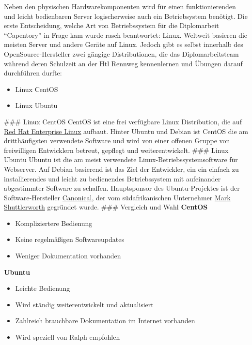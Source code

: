 \documentclass[
]{article}
\providecommand{\tightlist}{%
  \setlength{\itemsep}{0pt}\setlength{\parskip}{0pt}}
\begin{document}
Neben den physischen Hardwarekomponenten wird für einen funktionierenden
und leicht bedienbaren Server logischerweise auch ein Betriebsystem
benötigt. Die erste Entscheidung, welche Art von Betriebssystem für die
Diplomarbeit ``Capentory'' in Frage kam wurde rasch beantwortet: Linux.
Weltweit basieren die meisten Server und andere Geräte auf Linux. Jedoch
gibt es selbst innerhalb des OpenSource-Hersteller zwei gängige
Distributionen, die das Diplomarbeitsteam während deren Schulzeit an der
Htl Rennweg kennenlernen und Übungen darauf durchführen durfte:
\begin{itemize}
\tightlist
\item
  Linux CentOS
\item
  Linux Ubuntu
\end{itemize} 
\#\#\# Linux CentOS CentOS ist eine frei
verfügbare Linux Distribution, die auf
\href{https://de.wikipedia.org/wiki/Red_Hat_Enterprise_Linux}{Red Hat
Enterprise Linux} aufbaut. Hinter Ubuntu und Debian ist CentOS die am
dritthäufigsten verwendete Software und wird von einer offenen Gruppe
von freiwilligen Entwicklern betreut, gepflegt und weiterentwickelt.
\#\#\# Linux Ubuntu Ubuntu ist die am meist verwendete
Linux-Betriebssystemsoftware für Webserver. Auf Debian basierend ist das
Ziel der Entwickler, ein ein einfach zu installierendes und leicht zu
bedienendes Betriebssystem mit aufeinander abgestimmter Software zu
schaffen. Hauptsponsor des Ubuntu-Projektes ist der Software-Hersteller
\href{https://de.wikipedia.org/wiki/Canonical}{Canonical}, der vom
südafrikanischen Unternehmer
\href{https://de.wikipedia.org/wiki/Mark_Shuttleworth}{Mark
Shuttlerworth} gegründet wurde. \#\#\# Vergleich und Wahl
\textbf{CentOS} 
\begin{itemize}
\tightlist
\item
  Kompliziertere Bedienung
\item
  Keine regelmäßigen Softwareupdates
\item
  Weniger Dokumentation vorhanden
\end{itemize} 


\textbf{Ubuntu}

\begin{itemize}
\tightlist
\item
  Leichte Bedienung
\item
  Wird ständig weiterentwickelt und aktualisiert
\item
  Zahlreich brauchbare Dokumentation im Internet vorhanden
\item
  Wird speziell von Ralph empfohlen
\end{itemize}
\end{document}
